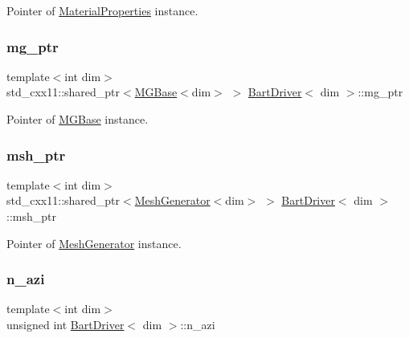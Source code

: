 Pointer of \hyperlink{class_material_properties}{Material\+Properties} instance. 

\mbox{\label{class_bart_driver_a1ae1a91d9a049ba4354c71f6ad689d74}} 
\subsubsection{\texorpdfstring{mg\+\_\+ptr}{mg\_ptr}}
{\footnotesize\ttfamily template$<$int dim$>$ \\
std\+\_\+cxx11\+::shared\+\_\+ptr$<$\hyperlink{class_m_g_base}{M\+G\+Base}$<$dim$>$ $>$ \hyperlink{class_bart_driver}{Bart\+Driver}$<$ dim $>$\+::mg\+\_\+ptr\hspace{0.3cm}{\ttfamily [private]}}



Pointer of \hyperlink{class_m_g_base}{M\+G\+Base} instance. 

\mbox{\label{class_bart_driver_a976c3ba1c98180dced85019dfd56e225}} 
\subsubsection{\texorpdfstring{msh\+\_\+ptr}{msh\_ptr}}
{\footnotesize\ttfamily template$<$int dim$>$ \\
std\+\_\+cxx11\+::shared\+\_\+ptr$<$\hyperlink{class_mesh_generator}{Mesh\+Generator}$<$dim$>$ $>$ \hyperlink{class_bart_driver}{Bart\+Driver}$<$ dim $>$\+::msh\+\_\+ptr\hspace{0.3cm}{\ttfamily [private]}}



Pointer of \hyperlink{class_mesh_generator}{Mesh\+Generator} instance. 

\mbox{\label{class_bart_driver_a3726013dac04d13b87e35cb0c3b8b557}} 
\subsubsection{\texorpdfstring{n\+\_\+azi}{n\_azi}}
{\footnotesize\ttfamily template$<$int dim$>$ \\
unsigned int \hyperlink{class_bart_driver}{Bart\+Driver}$<$ dim $>$\+::n\+\_\+azi\hspace{0.3cm}{\ttfamily [private]}}



